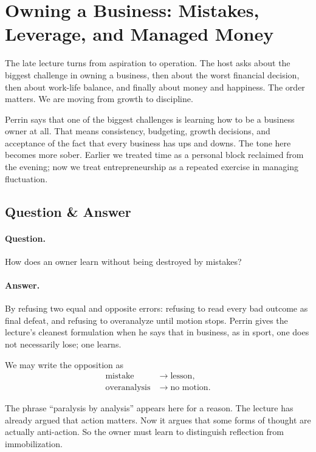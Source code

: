 \section{Owning a Business: Mistakes, Leverage, and Managed Money}

The late lecture turns from aspiration to operation. The host asks about the biggest challenge in owning a business, then about the worst financial decision, then about work-life balance, and finally about money and happiness. The order matters. We are moving from growth to discipline.

Perrin says that one of the biggest challenges is learning how to be a business owner at all. That means consistency, budgeting, growth decisions, and acceptance of the fact that every business has ups and downs. The tone here becomes more sober. Earlier we treated time as a personal block reclaimed from the evening; now we treat entrepreneurship as a repeated exercise in managing fluctuation.

\subsection{Question \& Answer}

\paragraph{Question.} How does an owner learn without being destroyed by mistakes?

\paragraph{Answer.} By refusing two equal and opposite errors: refusing to read every bad outcome as final defeat, and refusing to overanalyze until motion stops. Perrin gives the lecture's cleanest formulation when he says that in business, as in sport, one does not necessarily lose; one learns.

We may write the opposition as
\begin{align}
\text{mistake} &\to \text{lesson},\\
\text{overanalysis} &\to \text{no motion}.
\end{align}

The phrase ``paralysis by analysis'' appears here for a reason. The lecture has already argued that action matters. Now it argues that some forms of thought are actually anti-action. So the owner must learn to distinguish reflection from immobilization.


